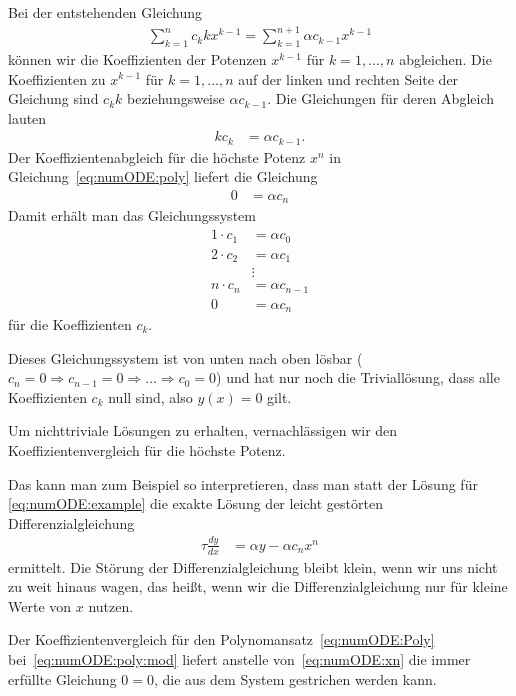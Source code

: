 \documentclass{article}
\def\ddx#1{\frac{d#1}{dx}}
\begin{document}
Bei der entstehenden Gleichung
\begin{align}
  \sum_{k = 1}^{n} c_k k x^{k-1} = \sum_{k=1}^{n+1}  \alpha c_{k-1} x^{k-1}
  \label{eq:numODE:poly}
\end{align}
können wir die Koeffizienten der Potenzen $x^{k-1}$ für $k=1,\ldots,n$
abgleichen. Die Koeffizienten zu $x^{k-1}$ für $k=1,\ldots,n$ auf der
linken und rechten Seite der Gleichung sind $c_k k$ beziehungsweise
$\alpha c_{k-1}$. Die Gleichungen für deren Abgleich lauten
\begin{align*}
  k c_{k} &= \alpha c_{k-1}.
\end{align*}
Der Koeffizientenabgleich für die höchste Potenz $x^n$ in
Gleichung~\eqref{eq:numODE:poly} liefert die Gleichung
\begin{align*}
  0 &= \alpha c_n
\end{align*}
Damit erhält man das Gleichungssystem
\begin{align}
  1\cdot c_1 &= \alpha c_0\label{eq:numODE:x0}\\
  2\cdot c_2 &= \alpha c_1\\
             &\vdots\\
  n\cdot c_{n} &= \alpha c_{n-1}\label{eq:numODE:xn1}\\
  0 &= \alpha c_n\label{eq:numODE:xn}
\end{align}
für die Koeffizienten $c_k$.

Dieses Gleichungssystem ist von unten nach oben lösbar
($c_n=0 \Rightarrow c_{n-1}=0 \Rightarrow \ldots\Rightarrow c_0 = 0$)
und hat nur noch die Triviallösung, dass alle Koeffizienten $c_k$ null
sind, also $y(x)=0$ gilt.

Um nichttriviale Lösungen zu erhalten, vernachlässigen wir den
Koeffizientenvergleich für die höchste Potenz.

Das kann man zum Beispiel so interpretieren, dass man statt der Lösung
für \eqref{eq:numODE:example} die exakte Lösung der leicht gestörten
Differenzialgleichung
\begin{align}
  \tau \ddx y &= \alpha y - \alpha c_n x^n
                \label{eq:numODE:poly:mod}
\end{align}
ermittelt. Die Störung der Differenzialgleichung bleibt klein, wenn
wir uns nicht zu weit hinaus wagen, das heißt, wenn wir die
Differenzialgleichung nur für kleine Werte von $x$ nutzen.

Der Koeffizientenvergleich für den
Polynomansatz~\eqref{eq:numODE:Poly} bei~\eqref{eq:numODE:poly:mod}
liefert anstelle von~\eqref{eq:numODE:xn} die immer erfüllte Gleichung
$0=0$, die aus dem System gestrichen werden kann.
\end{document}
